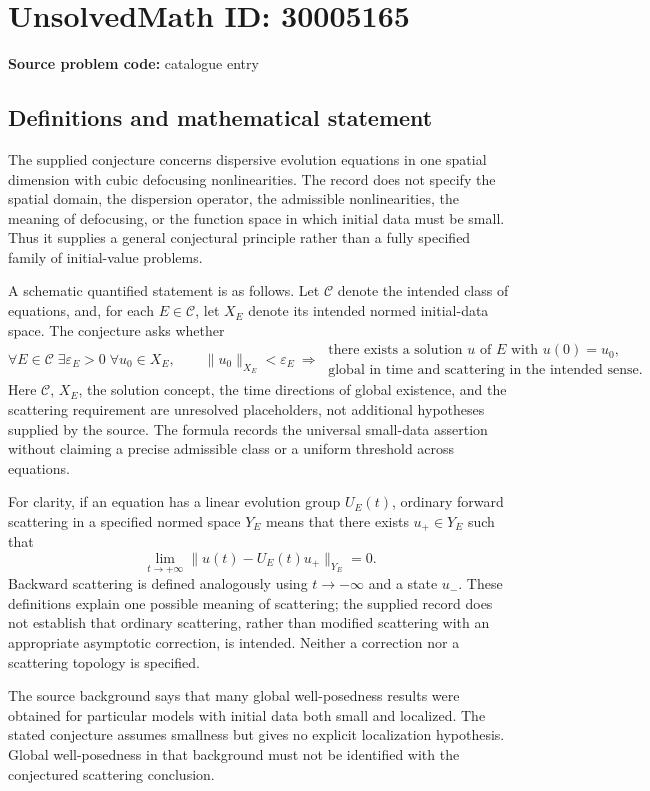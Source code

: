 \documentclass[11pt]{article}
\begin{document}
\section*{UnsolvedMath ID: 30005165}
\textbf{Source problem code:} catalogue entry
\subsection{Definitions and mathematical statement}
The supplied conjecture concerns dispersive evolution equations in one spatial dimension with cubic defocusing nonlinearities. The record does not specify the spatial domain, the dispersion operator, the admissible nonlinearities, the meaning of defocusing, or the function space in which initial data must be small. Thus it supplies a general conjectural principle rather than a fully specified family of initial-value problems.

A schematic quantified statement is as follows. Let \(\mathcal C\) denote the intended class of equations, and, for each \(E\in\mathcal C\), let \(X_E\) denote its intended normed initial-data space. The conjecture asks whether
\[
\forall E\in\mathcal C\;\exists\varepsilon_E>0\;\forall u_0\in X_E,\qquad
\|u_0\|_{X_E}<\varepsilon_E
\ \Longrightarrow\ 
\begin{gathered}
\text{there exists a solution }u\text{ of }E\text{ with }u(0)=u_0,\\
\text{global in time and scattering in the intended sense.}
\end{gathered}
\]
Here \(\mathcal C\), \(X_E\), the solution concept, the time directions of global existence, and the scattering requirement are unresolved placeholders, not additional hypotheses supplied by the source. The formula records the universal small-data assertion without claiming a precise admissible class or a uniform threshold across equations.

For clarity, if an equation has a linear evolution group \(U_E(t)\), ordinary forward scattering in a specified normed space \(Y_E\) means that there exists \(u_+\in Y_E\) such that
\[
\lim_{t\to+\infty}\|u(t)-U_E(t)u_+\|_{Y_E}=0.
\]
Backward scattering is defined analogously using \(t\to-\infty\) and a state \(u_-\). These definitions explain one possible meaning of scattering; the supplied record does not establish that ordinary scattering, rather than modified scattering with an appropriate asymptotic correction, is intended. Neither a correction nor a scattering topology is specified.

The source background says that many global well-posedness results were obtained for particular models with initial data both small and localized. The stated conjecture assumes smallness but gives no explicit localization hypothesis. Global well-posedness in that background must not be identified with the conjectured scattering conclusion.
\end{document}
